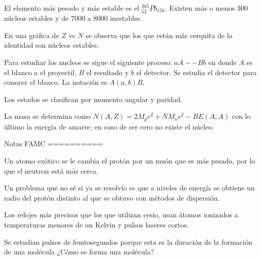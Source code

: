 El elemento más pesado y más estable es el
${}^{205}_{52}Pb_{156}$. Existen más o menos 300 núcleos
estables y de 7000 a 8000 inestables.

En una gráfica de $Z$ vs $N$ se observa que los que están
más cerquita de la identidad son núcleos estables.

Para estudiar los nucleos se sigue el siguiente proceso:
$a A -- B b$ en donde $A$ es el blanco $a$ el proyectil, $B$
el resultado y $b$ el detector. Se estudia el detector para
conocer el blanco. La notación es $A(a,b)B$.

Los estados se clasifican por momento angular y paridad.

La masa se determina como $N(A,Z) = 2 M_p c^2 + N M_n c^2 -
BE(A,A)$ con lo último la energía de amarre; en caso de ser
cero no existe el núcleo.

Notas FAMC
==========

Un atomo exótico se le cambia el protón por un muón que es
más pesado, por lo que el neutron está más cerca.

Un problema que no sé si ya se resolvío es que a niveles de
energía se obtiene un radio del protón distinto al que se
obtuvo con métodos de dispersión.

Los relojes más precisos que los que utilizan cesio, usan
átomos ionizados a temperaturas menores de un Kelvin y
pulsos laseres cortos.

Se estudian pulsos de femtosegundos porque esta es la
duración de la formación de una molécula
¿Cómo se forma una molécula?
